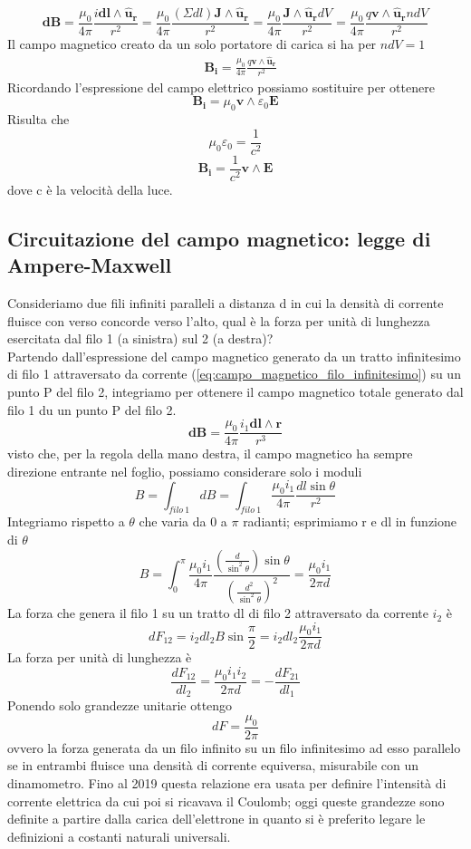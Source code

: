 \documentclass[
10pt, %
a4paper, %
oneside, %
headinclude,footinclude, %
BCOR5mm, %
]{scrartcl}
\begin{document}
\[\mathbf{dB}=\frac{\mu_0}{4\pi}\frac{i\mathbf{dl}\wedge\mathbf{\hat{u}_r}}{r^2}=\frac{\mu_0}{4\pi}\frac{(\Sigma dl)\mathbf{J}\wedge\mathbf{\hat{u}_r}}{r^2}=\frac{\mu_0}{4\pi}\frac{\mathbf{J}\wedge\mathbf{\hat{u}_r}dV}{r^2}=\frac{\mu_0}{4\pi}\frac{q\mathbf{v}\wedge\mathbf{\hat{u}_r}n dV}{r^2}\]
Il campo magnetico creato da un solo portatore di carica si ha per \(ndV=1\)
\begin{align*}
&\mathbf{B_i}=\frac{\mu_0}{4\pi}\frac{q\mathbf{v}\wedge\mathbf{\hat{u}_r}}{r^2} 
\end{align*}
Ricordando l'espressione del campo elettrico possiamo sostituire per ottenere
\[\mathbf{B_i}=\mu_0\mathbf{v}\wedge\varepsilon_0\mathbf{E}\]
Risulta che 
\[\mu_0\varepsilon_0=\frac{1}{c^2}\]
\[\mathbf{B_i}=\frac{1}{c^2}\mathbf{v}\wedge\mathbf{E}\]
dove c è la velocità della luce.
\subsection{Circuitazione del campo magnetico: legge di Ampere-Maxwell}
Consideriamo due fili infiniti paralleli a distanza d in cui la densità di corrente fluisce con verso concorde verso l'alto, qual è la forza per unità di lunghezza esercitata dal filo 1 (a sinistra) sul 2 (a destra)? \\
Partendo dall'espressione del campo magnetico generato da un tratto infinitesimo di filo 1 attraversato da corrente (\ref{eq:campo_magnetico_filo_infinitesimo}) su un punto P del filo 2, integriamo per ottenere il campo magnetico totale generato dal filo 1 du un punto P del filo 2. 
\[\mathbf{dB} = \frac{\mu_0}{4\pi}\frac{i_1\mathbf{dl}\wedge\mathbf{r}}{r^3} \]
visto che, per la regola della mano destra, il campo magnetico ha sempre direzione entrante nel foglio, possiamo considerare solo i moduli
\[B=\int_{filo\ 1}dB= \int_{filo\ 1}\frac{\mu_0 i_1 }{4\pi}\frac{dl \sin\theta}{r^2}\]
Integriamo rispetto a $\theta$ che varia da 0 a $\pi$ radianti; esprimiamo r e dl in funzione di $\theta$
\[B = \int_{0}^{\pi}\frac{\mu_0 i_1 }{4\pi}\frac{\left(\frac{d}{\sin^2\theta}\right) \sin\theta}{\left(\frac{d^2}{\sin^2\theta}\right)^2}= \frac{\mu_0 i_1}{2\pi d}\]
La forza che genera il filo 1 su un tratto dl di filo 2 attraversato da corrente \(i_2\) è 
\[dF_{12} = i_2dl_2 B\sin\frac{\pi}{2}=i_2dl_2 \frac{\mu_0 i_1}{2\pi d}\]
La forza per unità di lunghezza è 
\[\frac{dF_{12}}{dl_2}= \frac{\mu_0 i_1i_2}{2\pi d}=-\frac{dF_{21}}{dl_1}\]
Ponendo solo grandezze unitarie ottengo
\[dF = \frac{\mu_0}{2\pi}\]
ovvero la forza generata da un filo infinito su un filo infinitesimo ad esso parallelo se in entrambi fluisce una densità di corrente equiversa, misurabile con un dinamometro. Fino al 2019 questa relazione era usata per definire l'intensità di corrente elettrica da cui poi si ricavava il Coulomb; oggi queste grandezze sono definite a partire dalla carica dell'elettrone in quanto si è preferito legare le definizioni a costanti naturali universali.\\
\end{document}
